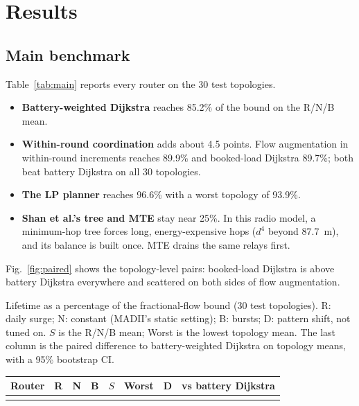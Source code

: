\section{Results}\label{sec:results}

\subsection{Main benchmark}\label{sec:main}
Table~\ref{tab:main} reports every router on the 30 test topologies.
\begin{itemize}[leftmargin=*]
  \item \textbf{Battery-weighted Dijkstra} reaches 85.2\% of the bound on the R/N/B mean.
  \item \textbf{Within-round coordination} adds about 4.5 points. Flow augmentation in within-round increments reaches 89.9\% and booked-load Dijkstra 89.7\%; both beat battery Dijkstra on all 30 topologies.
  \item \textbf{The LP planner} reaches 96.6\% with a worst topology of 93.9\%.
  \item \textbf{Shan et al.'s tree and MTE} stay near 25\%. In this radio model, a minimum-hop tree forces long, energy-expensive hops ($d^4$ beyond 87.7~m), and its balance is built once. MTE drains the same relays first.
\end{itemize}
Fig.~\ref{fig:paired} shows the topology-level pairs: booked-load Dijkstra is above battery Dijkstra everywhere and scattered on both sides of flow augmentation.

\begin{widetab}
\centering
\caption{Lifetime as a percentage of the fractional-flow bound (30 test topologies). R: daily surge; N: constant (MADII's static setting); B: bursts; D: pattern shift, not tuned on. $S$ is the R/N/B mean; Worst is the lowest topology mean. The last column is the paired difference to battery-weighted Dijkstra on topology means, with a 95\% bootstrap CI.}\label{tab:main}
\footnotesize
\setlength{\tabcolsep}{4pt}
\begin{adjustbox}{max width=\linewidth}
\begin{tabular}{@{}L{0.27\textwidth}rrrrrrr@{}}
\toprule
Router & R & N & B & $S$ & Worst & D & vs battery Dijkstra\\
\midrule
{}
\bottomrule
\end{tabular}
\end{adjustbox}
\end{widetab}

